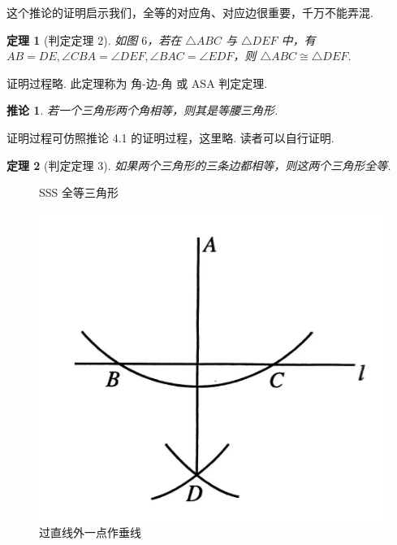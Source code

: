 \documentclass[a4paper]{article}
\newtheorem{theorem}{定理}[section]
\newtheorem{corollary}{推论}[section]
\begin{document}
这个推论的证明启示我们，全等的对应角、对应边很重要，千万不能弄混.

\begin{theorem}[判定定理 2]
    如图 $6$，若在 $\triangle ABC$ 与 $\triangle DEF$ 中，有 $AB=DE,\angle CBA=\angle DEF,\angle BAC=\angle EDF$，则
    $\triangle ABC\cong \triangle DEF$.
\end{theorem}

证明过程略. 此定理称为 角-边-角 或 ASA 判定定理.

\begin{corollary}
    若一个三角形两个角相等，则其是等腰三角形.
\end{corollary}

证明过程可仿照推论 4.1 的证明过程，这里略. 读者可以自行证明.

\begin{theorem}[判定定理 3]
    如果两个三角形的三条边都相等，则这两个三角形全等.
\end{theorem}

\begin{figure}[htbp]
    \centering
    \begin{minipage}{0.4\textwidth}
        \centering
        \caption{SSS 全等三角形}
    \end{minipage}
    \begin{minipage}{0.4\textwidth}
        \centering
        \includegraphics[width=\linewidth]{Pictures/O1-13.jpg}
        \caption{过直线外一点作垂线}
    \end{minipage}
\end{figure}
\end{document}
